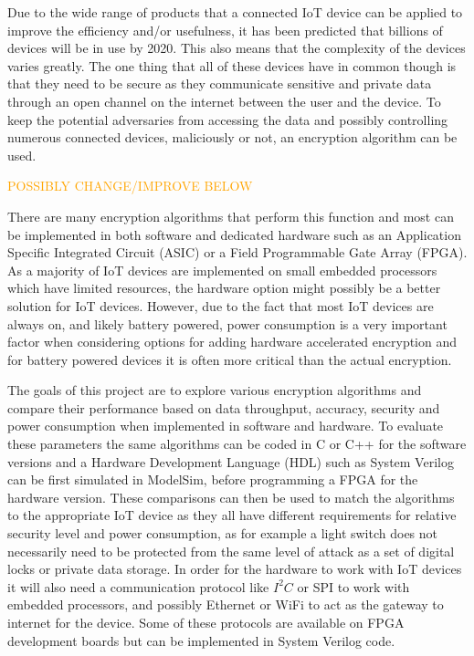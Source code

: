 \documentclass[12pt,twoside,a4paper]{report}
\begin{document}
	Due to the wide range of products that a connected IoT device can be applied to improve the efficiency and/or usefulness, it has been predicted that billions of devices will be in use by 2020\cite{Evans2011}. This also means that the complexity of the devices varies greatly. The one thing that all of these devices have in common though is that they need to be secure as they communicate sensitive and private data through an open channel on the internet between the user and the device. To keep the potential adversaries from accessing the data and possibly controlling numerous connected devices, maliciously or not, an encryption algorithm can be used.
    
	\textcolor{orange}{POSSIBLY CHANGE/IMPROVE BELOW}      
        
	There are many encryption algorithms that perform this function and most can be implemented in both software and dedicated hardware such as an Application Specific Integrated Circuit (ASIC) or a Field Programmable Gate Array (FPGA). As a majority of IoT devices are implemented on small embedded processors which have limited resources, the hardware option might possibly be a better solution for IoT devices. However, due to the fact that most IoT devices are always on, and likely battery powered, power consumption is a very important factor when considering options for adding hardware accelerated encryption and for battery powered devices it is often more critical than the actual encryption.
    
	The goals of this project are to explore various encryption algorithms and compare their performance based on data throughput, accuracy, security and power consumption when implemented in software and hardware. To evaluate these parameters the same algorithms can be coded in C or C++ for the software versions and a Hardware Development Language (HDL) such as System Verilog can be first simulated in ModelSim, before programming a FPGA for the hardware version. These comparisons can then be used to match the algorithms to the appropriate IoT device as they all have different requirements for relative security level and power consumption, as for example a light switch does not necessarily need to be protected from the same level of attack as a set of digital locks or private data storage. In order for the hardware to work with IoT devices it will also need a communication protocol like $I^2 C$ or SPI to work with embedded processors, and possibly Ethernet or WiFi to act as the gateway to internet for the device. Some of these protocols are available on FPGA development boards but can be implemented in System Verilog code.
    
\end{document}
